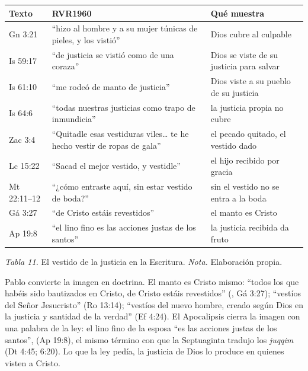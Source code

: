 \begin{center}\small\renewcommand{\arraystretch}{1.22}
\begin{tabular}{@{}L{2.4cm}L{6.4cm}L{5.4cm}@{}}
\toprule
\textbf{Texto} & \textbf{RVR1960} & \textbf{Qué muestra} \\ \midrule
Gn 3:21 & ``hizo al hombre y a su mujer túnicas de pieles, y los vistió'' & Dios cubre al culpable \\
Is 59:17 & ``de justicia se vistió como de una coraza'' & Dios se viste de su justicia para salvar \\
Is 61:10 & ``me rodeó de manto de justicia'' & Dios viste a su pueblo de su justicia \\
Is 64:6 & ``todas nuestras justicias como trapo de inmundicia'' & la justicia propia no cubre \\
Zac 3:4 & ``Quitadle esas vestiduras viles\ldots{} te he hecho vestir de ropas de gala'' & el pecado quitado, el vestido dado \\
Lc 15:22 & ``Sacad el mejor vestido, y vestidle'' & el hijo recibido por gracia \\
Mt 22:11--12 & ``¿cómo entraste aquí, sin estar vestido de boda?'' & sin el vestido no se entra a la boda \\
Gá 3:27 & ``de Cristo estáis revestidos'' & el manto es Cristo \\
Ap 19:8 & ``el lino fino es las acciones justas de los santos'' & la justicia recibida da fruto \\
\bottomrule
\end{tabular}\par
{\footnotesize\color{gris}\textit{Tabla 11.} El vestido de la justicia en la Escritura. \textit{Nota.} Elaboración propia.}
\end{center}

Pablo convierte la imagen en doctrina. El manto es Cristo mismo: ``todos los que habéis sido bautizados en Cristo, de Cristo estáis revestidos'' (, Gá 3:27); ``vestíos del Señor Jesucristo'' (Ro 13:14); ``vestíos del nuevo hombre, creado según Dios en la justicia y santidad de la verdad'' (Ef 4:24). El Apocalipsis cierra la imagen con una palabra de la ley: el lino fino de la esposa ``es las acciones justas de los santos'',  (Ap 19:8), el mismo término con que la Septuaginta tradujo los \emph{juqqim} (Dt 4:45; 6:20). Lo que la ley pedía, la justicia de Dios lo produce en quienes visten a Cristo.


